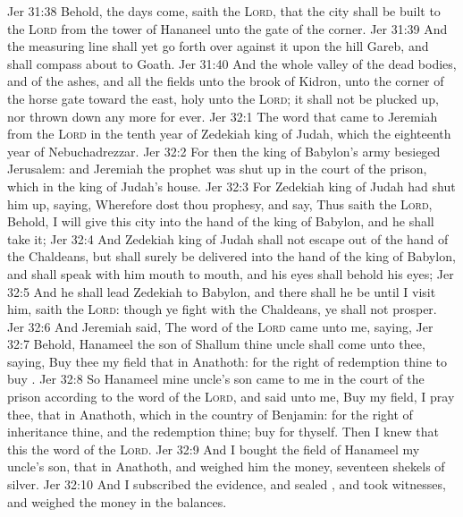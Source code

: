 \vs Jer 31:38 Behold, the days come, saith the \textsc{Lord}, that the city shall be built to the \textsc{Lord} from the tower of Hananeel unto the gate of the corner.
\vs Jer 31:39 And the measuring line shall yet go forth over against it upon the hill Gareb, and shall compass about to Goath.
\vs Jer 31:40 And the whole valley of the dead bodies, and of the ashes, and all the fields unto the brook of Kidron, unto the corner of the horse gate toward the east,  holy unto the \textsc{Lord}; it shall not be plucked up, nor thrown down any more for ever.
\vs Jer 32:1 The word that came to Jeremiah from the \textsc{Lord} in the tenth year of Zedekiah king of Judah, which  the eighteenth year of Nebuchadrezzar.
\vs Jer 32:2 For then the king of Babylon's army besieged Jerusalem: and Jeremiah the prophet was shut up in the court of the prison, which  in the king of Judah's house.
\vs Jer 32:3 For Zedekiah king of Judah had shut him up, saying, Wherefore dost thou prophesy, and say, Thus saith the \textsc{Lord}, Behold, I will give this city into the hand of the king of Babylon, and he shall take it;
\vs Jer 32:4 And Zedekiah king of Judah shall not escape out of the hand of the Chaldeans, but shall surely be delivered into the hand of the king of Babylon, and shall speak with him mouth to mouth, and his eyes shall behold his eyes;
\vs Jer 32:5 And he shall lead Zedekiah to Babylon, and there shall he be until I visit him, saith the \textsc{Lord}: though ye fight with the Chaldeans, ye shall not prosper.
\vs Jer 32:6 And Jeremiah said, The word of the \textsc{Lord} came unto me, saying,
\vs Jer 32:7 Behold, Hanameel the son of Shallum thine uncle shall come unto thee, saying, Buy thee my field that  in Anathoth: for the right of redemption  thine to buy .
\vs Jer 32:8 So Hanameel mine uncle's son came to me in the court of the prison according to the word of the \textsc{Lord}, and said unto me, Buy my field, I pray thee, that  in Anathoth, which  in the country of Benjamin: for the right of inheritance  thine, and the redemption  thine; buy  for thyself. Then I knew that this  the word of the \textsc{Lord}.
\vs Jer 32:9 And I bought the field of Hanameel my uncle's son, that  in Anathoth, and weighed him the money,  seventeen shekels of silver.
\vs Jer 32:10 And I subscribed the evidence, and sealed , and took witnesses, and weighed  the money in the balances.
